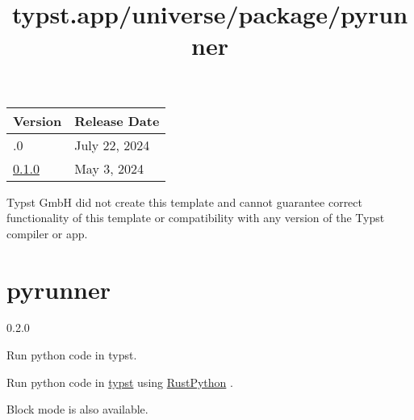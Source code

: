 \begin{longtable}[]{@{}ll@{}}
\toprule\noalign{}
Version & Release Date \\
\midrule\noalign{}
\endhead
\bottomrule\noalign{}
\endlastfoot
1.0.0 & July 22, 2024 \\
\href{https://typst.app/universe/package/grape-suite/0.1.0/}{0.1.0} &
May 3, 2024 \\
\end{longtable}

Typst GmbH did not create this template and cannot guarantee correct
functionality of this template or compatibility with any version of the
Typst compiler or app.


\title{typst.app/universe/package/pyrunner}

\label{banner}
\section{pyrunner}\label{pyrunner}

{ 0.2.0 }

Run python code in typst.

\label{readme}
Run python code in \href{https://typst.app/}{typst} using
\href{https://github.com/RustPython/RustPython}{RustPython} .

\begin{Shaded}
\begin{Highlighting}[]


\NormalTok{\textasciigrave{}\textasciigrave{}\textasciigrave{})}


\end{Highlighting}
\end{Shaded}

Block mode is also available.

